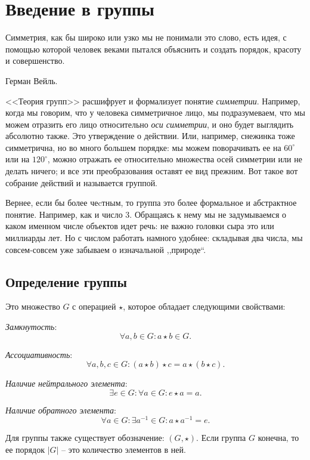 \section{Введение в группы}

\epigraph{Симметрия, как бы широко или узко мы не понимали это слово, есть идея, с помощью которой человек веками пытался объяснить и создать порядок, красоту и совершенство.}{Герман Вейль.}

<<Теория групп>> расшифрует и формализует понятие \emph{симметрии}. Например, когда мы говорим, что у человека симметричное лицо, мы подразумеваем, что мы можем отразить его лицо относительно \emph{оси симметрии}, и оно будет выглядить абсолютно также. Это утверждение о действии. Или, например, снежинка тоже симметрична, но во много большем порядке: мы можем поворачивать ее на $60^\circ$ или на $120^\circ$, можно отражать ее относительно множества осей симметрии или не делать ничего; и все эти преобразования оставят ее вид прежним. Вот такое вот собрание действий и называется группой. 

Вернее, если бы более чеcтным, то группа это более формальное и абстрактное понятие. Например, как и число 3. Обращаясь к нему мы не задумываемся о каком именном числе объектов идет речь: не важно головки сыра это или миллиарды лет. Но с числом работать намного удобнее: складывая два числа, мы совсем-совсем уже забываем о изначальной ,,природе``.
\subsection{Определение группы}
\begin{definition}
    [Группа]
    Это множество $G$ с операцией $\star$, которое обладает следующими свойствами: 
    \begin{conditions}
        \item \textit{Замкнутость}: $$\forall a, b \in G: a \star b \in G.$$
        \item \textit{Ассоциативность}: $$\forall a, b, c \in G: (a \star b) \star c = a \star (b \star c).$$
        \item \textit{Наличие нейтрального элемента}: $$\exists e \in G: \forall a \in G: e \star a = a.$$
        \item \textit{Наличие обратного элемента}: $$\forall a \in G: \exists a^{-1} \in G: a \star a^{-1} = e.$$
    \end{conditions}
    Для группы также существует обозначение: $(G, \star).$
    Если группа $G$ конечна, то ее порядок $|G|$ -- это количество элементов в ней.
\end{definition}

